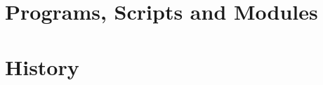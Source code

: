 \documentclass[12pt,a4paper]{book}
\begin{document}
\chapter{Programs, Scripts and Modules} %

%


%
%
\chapter*{History}

%

%
\end{document}

